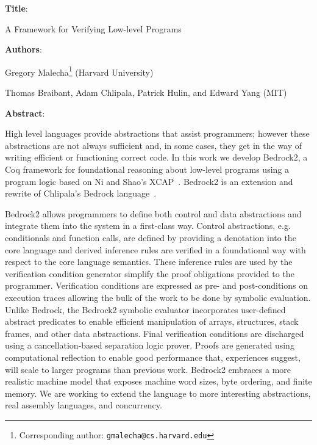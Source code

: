 \documentclass{article}
\begin{document}
\noindent \textbf{Title}:

\noindent A Framework for Verifying Low-level Programs
\vspace{1em}

\noindent \textbf{Authors}:

\noindent Gregory Malecha\footnote{Corresponding author: \texttt{gmalecha@cs.harvard.edu}} (Harvard University) 

\noindent Thomas Braibant, Adam Chlipala, Patrick Hulin, and Edward Yang (MIT)

\vspace{1em} 

\noindent \textbf{Abstract}:

High level languages provide abstractions that assist programmers; however these abstractions are not always sufficient and, in some cases, they get in the way of writing efficient or functioning correct code. In this work we develop Bedrock2, a Coq framework for foundational reasoning about low-level programs using a program logic based on Ni and Shao's XCAP~\cite{ni2007xcap}. Bedrock2 is an extension and rewrite of Chlipala's Bedrock language~\cite{chlipala2011bedrock}.

Bedrock2 allows programmers to define both control and data abstractions and integrate them into the system in a first-class way. Control abstractions, e.g. conditionals and function calls, are defined by providing a denotation into the core language and derived inference rules are verified in a foundational way with respect to the core language semantics. These inference rules are used by the verification condition generator simplify the proof obligations provided to the programmer. Verification conditions are expressed as pre- and post-conditions on execution traces allowing the bulk of the work to be done by symbolic evaluation. Unlike Bedrock, the Bedrock2 symbolic evaluator incorporates user-defined abstract predicates to enable efficient manipulation of arrays, structures, stack frames, and other data abstractions. Final verification conditions are discharged using a cancellation-based separation logic prover. Proofs are generated using computational reflection to enable good performance that, experiences suggest, will scale to larger programs than previous work. Bedrock2 embraces a more realistic machine model that exposes machine word sizes, byte ordering, and finite memory. We are working to extend the language to more interesting abstractions, real assembly languages, and concurrency.



\end{document}
